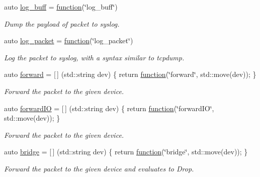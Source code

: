 \begin{DoxyCompactItemize}
auto \hyperlink{namespacepfq_1_1lang_1_1anonymous__namespace_02default_8hpp_03_ac16d4c4b496e6e882901d84ded462101}{log\+\_\+buff} = \hyperlink{namespacepfq_1_1lang_a1a4638059d700ae08d0ca63886ff2bb3}{function}(\char`\"{}log\+\_\+buff\char`\"{})
\begin{DoxyCompactList}\small\item\em Dump the payload of packet to syslog. \end{DoxyCompactList}\item 
auto \hyperlink{namespacepfq_1_1lang_1_1anonymous__namespace_02default_8hpp_03_aed6076a98aece625738cbda3689183e2}{log\+\_\+packet} = \hyperlink{namespacepfq_1_1lang_a1a4638059d700ae08d0ca63886ff2bb3}{function}(\char`\"{}log\+\_\+packet\char`\"{})
\begin{DoxyCompactList}\small\item\em Log the packet to syslog, with a syntax similar to tcpdump. \end{DoxyCompactList}\item 
auto \hyperlink{namespacepfq_1_1lang_1_1anonymous__namespace_02default_8hpp_03_aae08247030fea0f5e398b0a03d382257}{forward} = \mbox{[}$\,$\mbox{]} (std\+::string dev) \{ return \hyperlink{namespacepfq_1_1lang_a1a4638059d700ae08d0ca63886ff2bb3}{function}(\char`\"{}forward\char`\"{}, std\+::move(dev)); \}
\begin{DoxyCompactList}\small\item\em Forward the packet to the given device. \end{DoxyCompactList}\item 
auto \hyperlink{namespacepfq_1_1lang_1_1anonymous__namespace_02default_8hpp_03_a3fb6ec42e38c3329534ea3a7024fd967}{forward\+IO} = \mbox{[}$\,$\mbox{]} (std\+::string dev) \{ return \hyperlink{namespacepfq_1_1lang_a1a4638059d700ae08d0ca63886ff2bb3}{function}(\char`\"{}forward\+IO\char`\"{}, std\+::move(dev)); \}
\begin{DoxyCompactList}\small\item\em Forward the packet to the given device. \end{DoxyCompactList}\item 
auto \hyperlink{namespacepfq_1_1lang_1_1anonymous__namespace_02default_8hpp_03_ad318dd8fb6441b78bdfb056173e5a7e2}{bridge} = \mbox{[}$\,$\mbox{]} (std\+::string dev) \{ return \hyperlink{namespacepfq_1_1lang_a1a4638059d700ae08d0ca63886ff2bb3}{function}(\char`\"{}bridge\char`\"{}, std\+::move(dev)); \}
\begin{DoxyCompactList}\small\item\em Forward the packet to the given device and evaluates to {\ttfamily Drop}. \end{DoxyCompactList}\item 

\end{DoxyCompactItemize}
